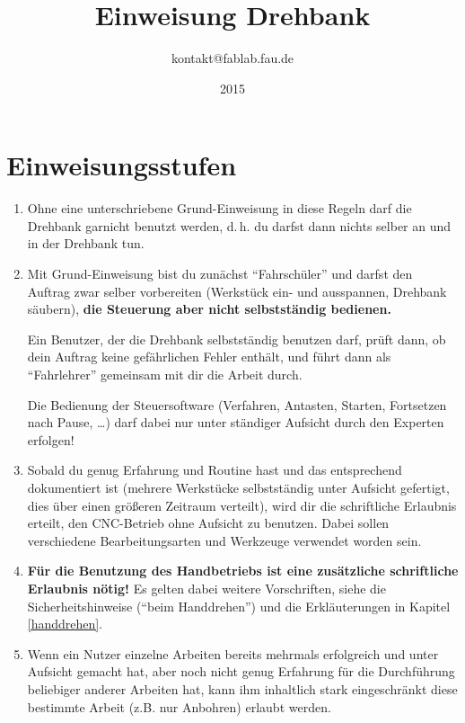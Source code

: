 \documentclass{\basedir/fablab-document}
\date{2015}
\author{kontakt@fablab.fau.de}
\title{Einweisung Drehbank}
\begin{document}
\listoftodos \newpage %

\tableofcontents

\newpage



\section{Einweisungsstufen}


\begin{enumerate}
	\item Ohne eine unterschriebene Grund-Einweisung in diese Regeln darf die Drehbank garnicht benutzt werden, d.\,h. du darfst dann nichts selber an und in der Drehbank tun.
	\item Mit Grund-Einweisung bist du zunächst \enquote{Fahrschüler} und darfst den Auftrag zwar selber vorbereiten (Werkstück ein- und ausspannen, Drehbank säubern), \textbf{die Steuerung aber nicht selbstständig bedienen.} 

       Ein Benutzer, der die Drehbank selbstständig benutzen darf, prüft dann, ob dein Auftrag keine gefährlichen Fehler enthält, und führt dann als \enquote{Fahrlehrer} gemeinsam mit dir die Arbeit durch.

 Die Bedienung der Steuersoftware (Verfahren, Antasten, Starten, Fortsetzen nach Pause, \dots) darf dabei nur unter ständiger Aufsicht durch den Experten erfolgen!
	\item Sobald du genug Erfahrung und Routine hast und das entsprechend dokumentiert ist (mehrere Werkstücke selbstständig unter Aufsicht gefertigt, dies über einen größeren Zeitraum verteilt), wird dir die schriftliche Erlaubnis erteilt, den CNC-Betrieb ohne Aufsicht zu benutzen. Dabei sollen verschiedene Bearbeitungsarten und Werkzeuge verwendet worden sein.
	\item  \textbf{Für die Benutzung des Handbetriebs ist eine zusätzliche schriftliche Erlaubnis nötig!} Es gelten dabei weitere Vorschriften, siehe die Sicherheitshinweise (\enquote{beim Handdrehen}) und die Erkläuterungen in Kapitel \ref{handdrehen}.
	\item Wenn ein Nutzer einzelne Arbeiten bereits mehrmals erfolgreich und unter Aufsicht gemacht hat, aber noch nicht genug Erfahrung für die Durchführung beliebiger anderer Arbeiten hat, kann ihm inhaltlich stark eingeschränkt diese bestimmte Arbeit (z.B. nur Anbohren) erlaubt werden.
\end{enumerate}
\end{document}
